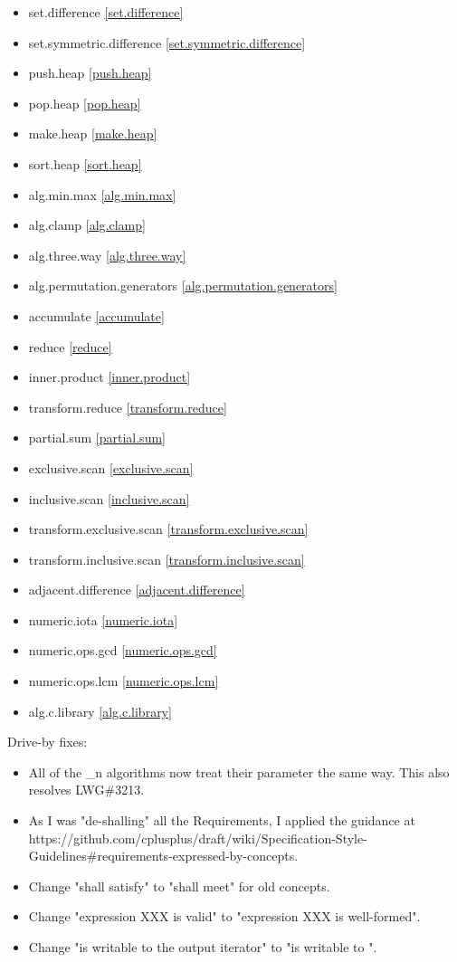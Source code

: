 \begin{multicols}{3}
\begin{itemize}
\item{set.difference}				\ref{set.difference}
\item{set.symmetric.difference}		\ref{set.symmetric.difference}
\item{push.heap}					\ref{push.heap}
\item{pop.heap}						\ref{pop.heap}
\item{make.heap}					\ref{make.heap}
\item{sort.heap}					\ref{sort.heap}
\item{alg.min.max}					\ref{alg.min.max}
\item{alg.clamp}					\ref{alg.clamp}
\item{alg.three.way}				\ref{alg.three.way}
\item{alg.permutation.generators}	\ref{alg.permutation.generators}
\item{accumulate}					\ref{accumulate}
\item{reduce}						\ref{reduce}
\item{inner.product}				\ref{inner.product}
\item{transform.reduce}				\ref{transform.reduce}
\item{partial.sum}					\ref{partial.sum}
\item{exclusive.scan}				\ref{exclusive.scan}
\item{inclusive.scan}				\ref{inclusive.scan}
\item{transform.exclusive.scan}		\ref{transform.exclusive.scan}
\item{transform.inclusive.scan}		\ref{transform.inclusive.scan}
\item{adjacent.difference}			\ref{adjacent.difference}
\item{numeric.iota}					\ref{numeric.iota}
\item{numeric.ops.gcd}				\ref{numeric.ops.gcd}
\item{numeric.ops.lcm}				\ref{numeric.ops.lcm}
\item{alg.c.library}				\ref{alg.c.library}
\end{itemize}
\end{multicols}

Drive-by fixes:
\begin{itemize}
\item{All of the \*_n algorithms now treat their  parameter the same way. This also resolves LWG\#3213.}
\item{As I was "de-shalling" all the Requirements, I applied the guidance at https://github.com/cplusplus/draft/wiki/Specification-Style-Guidelines\#requirements-expressed-by-concepts.}
\item{Change "shall satisfy" to "shall meet" for old concepts.}
\item{Change "expression XXX is valid" to "expression XXX is well-formed".}
\item{Change "is writable to the  output iterator" to "is writable to ".}
\end{itemize}

